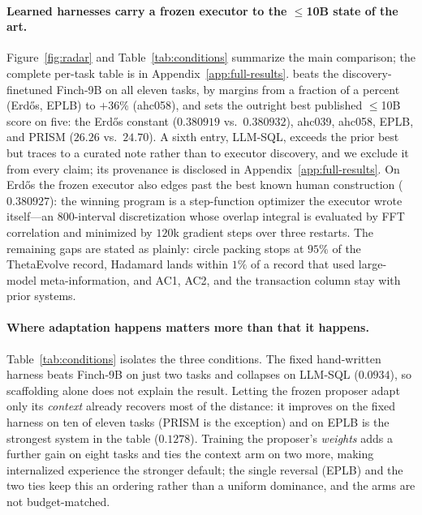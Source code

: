 \paragraph{Learned harnesses carry a frozen executor to the $\le$10B state
of the art.}  Figure~\ref{fig:radar} and Table~\ref{tab:conditions}
summarize the main comparison; the complete per-task table is in
Appendix~\ref{app:full-results}.  \method{} beats the discovery-finetuned
Finch-9B on all eleven tasks, by margins from a fraction of a percent
(Erd\H{o}s, EPLB) to $+36\%$ (ahc058), and sets the outright best published
$\le$10B score on five: the Erd\H{o}s constant ($0.380919$ vs.\ $0.380932$),
ahc039, ahc058, EPLB, and PRISM ($26.26$ vs.\ $24.70$).  A sixth entry,
LLM-SQL, exceeds the prior best but traces to a curated note rather than to
executor discovery, and we exclude it from every claim; its provenance is
disclosed in Appendix~\ref{app:full-results}.  On Erd\H{o}s the
frozen executor also edges past the best known human construction
($0.380927$): the winning program is a step-function optimizer the executor
wrote itself---an $800$-interval discretization whose overlap integral is
evaluated by FFT correlation and minimized by $120$k gradient steps over
three restarts.  The remaining gaps are stated as plainly: circle packing
stops at $95\%$ of the ThetaEvolve record, Hadamard lands within $1\%$ of a
record that used large-model meta-information, and AC1, AC2, and the
transaction column stay with prior systems.

\paragraph{Where adaptation happens matters more than that it happens.}
Table~\ref{tab:conditions} isolates the three conditions.  The fixed
hand-written harness beats Finch-9B on just two tasks and collapses on
LLM-SQL ($0.0934$), so scaffolding alone does not explain the result.
Letting the frozen proposer adapt only its \emph{context} already recovers
most of the distance: it improves on the fixed harness on ten of eleven
tasks (PRISM is the exception) and on EPLB is the strongest system in the
table ($0.1278$).  Training the proposer's \emph{weights} adds a further
gain on eight tasks and ties the context arm on two more, making
internalized experience the stronger default; the single reversal (EPLB)
and the two ties keep this an ordering rather than a uniform dominance, and
the arms are not budget-matched.

